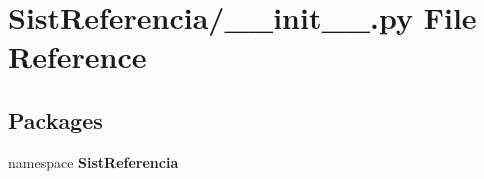 \section{\-Sist\-Referencia/\-\_\-\-\_\-init\-\_\-\-\_\-.py \-File \-Reference}
\label{_sist_referencia_2____init_____8py}
\subsection*{\-Packages}
\begin{DoxyCompactItemize}
\item 
namespace {\bf \-Sist\-Referencia}
\end{DoxyCompactItemize}
